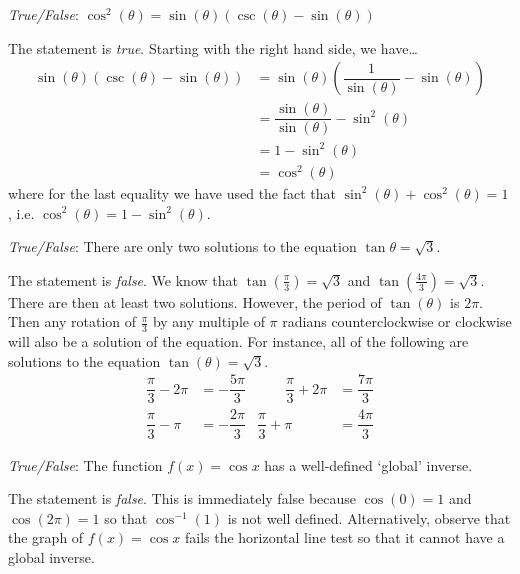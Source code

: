 \documentclass[11pt,letterpaper]{article}
\begin{document}
\newpage



\quizsol \textit{True/False}: $\cos^2(\theta)= \sin(\theta) \left( \csc(\theta) - \sin(\theta) \right)$ \pspace

\sol The statement is \textit{true}. Starting with the right hand side, we have\dots
	\[
	\begin{aligned}
	 \sin(\theta) \left( \csc(\theta) - \sin(\theta) \right)&=  \sin(\theta) \left( \dfrac{1}{\sin(\theta)} - \sin(\theta) \right) \\[0.3cm]
	 &= \dfrac{\sin(\theta)}{\sin(\theta)} - \sin^2(\theta) \\[0.3cm]
	 &= 1 - \sin^2(\theta) \\[0.3cm]
	 &= \cos^2(\theta)
	\end{aligned}
	\]
where for the last equality we have used the fact that $\sin^2(\theta) + \cos^2(\theta)= 1$, i.e. $\cos^2(\theta)= 1 - \sin^2(\theta)$. \pvspace{1.3cm}



\quizsol \textit{True/False}: There are only two solutions to the equation $\tan \theta= \sqrt{3}$. \pspace

\sol The statement is \textit{false}. We know that $\tan \left( \frac{\pi}{3} \right)= \sqrt{3}$ and $\tan \left( \frac{4\pi}{3} \right)= \sqrt{3}$. There are then at least two solutions. However, the period of $\tan(\theta)$ is $2\pi$. Then any rotation of $\frac{\pi}{3}$ by any multiple of $\pi$ radians counterclockwise or clockwise will also be a solution of the equation. For instance, all of the following are solutions to the equation $\tan(\theta)= \sqrt{3}$. 
	\[
	\begin{aligned}
	\dfrac{\pi}{3} - 2 \pi&= -\dfrac{5\pi}{3} &\qquad \dfrac{\pi}{3} + 2\pi&= \dfrac{7\pi}{3} \\[0.3cm]
	\dfrac{\pi}{3} - \pi&= -\dfrac{2\pi}{3} & \dfrac{\pi}{3} + \pi&= \dfrac{4\pi}{3}
	\end{aligned}
	\]



\quizsol \textit{True/False}: The function $f(x)= \cos x$ has a well-defined `global' inverse. \pspace

\sol The statement is \textit{false}. This is immediately false because $\cos(0)= 1$ and $\cos(2\pi)= 1$ so that $\cos^{-1}(1)$ is not well defined. Alternatively, observe that the graph of $f(x)= \cos x$ fails the horizontal line test so that it cannot have a global inverse. \par
\end{document}
